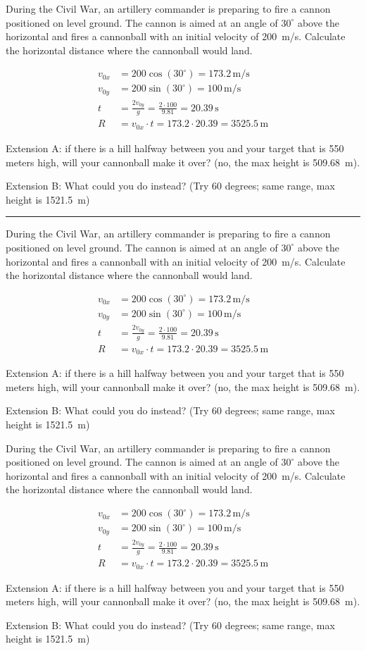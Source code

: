 \documentclass[12pt]{exam}
\begin{document}
\Large



\newcommand{\theq}{
  \noindent
  During the Civil War, an artillery commander is preparing to fire a cannon positioned on level ground. The cannon is aimed at an angle of $30^\circ$ above the horizontal and fires a cannonball with an initial velocity of 200~m/s.  Calculate the horizontal distance where the cannonball would land.

  \begin{solution}
    \begin{align*}
      v_{0x} &= 200 \cos(30^\circ) = 173.2 \, \text{m/s}\\
      v_{0y} &= 200 \sin(30^\circ) = 100 \, \text{m/s} \\
      t &= \frac{2 v_{0y}}{g} = \frac{2 \cdot 100}{9.81} = 20.39 \, \text{s} \\
      R &= v_{0x} \cdot t = 173.2 \cdot 20.39 = 3525.5 \, \text{m}
    \end{align*}

    Extension A: if there is a hill halfway between you and your target that is 550 meters high, will your cannonball make it over?  (no, the  max height is 509.68~m).

    Extension B: What could you do instead? (Try 60 degrees; same range, max height is 1521.5~m)
\end{solution}
}

\theq

\vs \hrule \vs

\theq

\vs

\pagebreak

\printanswers \theq
\end{document}
